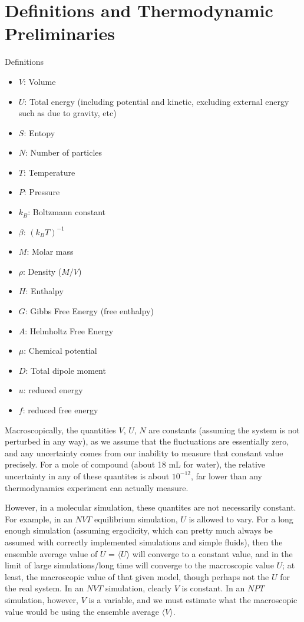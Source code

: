 \documentclass[9pt,bestpractices]{livecoms}
\begin{document}
\section{Definitions and Thermodynamic Preliminaries}

Definitions
\begin{itemize}
\item $V$: Volume
\item $U$: Total energy (including potential and kinetic, excluding external energy such as due to gravity, etc)
\item $S$: Entopy
\item $N$: Number of particles
\item $T$: Temperature
\item $P$: Pressure
\item $k_B$: Boltzmann constant
\item $\beta$: $(k_B T)^{-1}$
\item $M$: Molar mass
\item $\rho$: Density ($M/V$)
\item $H$: Enthalpy 
\item $G$: Gibbs Free Energy (free enthalpy)
\item $A$: Helmholtz Free Energy
\item $\mu$: Chemical potential
\item $D$: Total dipole moment
\item $u$: reduced energy
\item $f$: reduced free energy
\end{itemize}

Macroscopically, the quantities $V$, $U$, $N$ are constants (assuming
the system is not perturbed in any way), as we assume that the
fluctuations are essentially zero, and any uncertainty comes from our
inability to measure that constant value precisely. For a mole of
compound (about 18 mL for water), the relative uncertainty in any of
these quantites is about $10^{-12}$, far lower than any thermodynamics
experiment can actually measure.


However, in a molecular simulation, these quantites are not
necessarily constant. For example, in an $NVT$ equilibrium simulation,
$U$ is allowed to vary. For a long enough simulation (assuming
ergodicity, which can pretty much always be assumed with correctly
implemented simulations and simple fluids), then the ensemble average
value of $U$ = $\langle U \rangle$ will converge to a constant value,
and in the limit of large simulations/long time will converge to the
macroscopic value $U$; at least, the macroscopic value of that given
model, though perhaps not the $U$ for the real system. In an $NVT$
simulation, clearly $V$ is constant.  In an $NPT$ simulation, however,
$V$ is a variable, and we must estimate what the macroscopic value
would be using the ensemble average $\langle V \rangle$.
\end{document}
